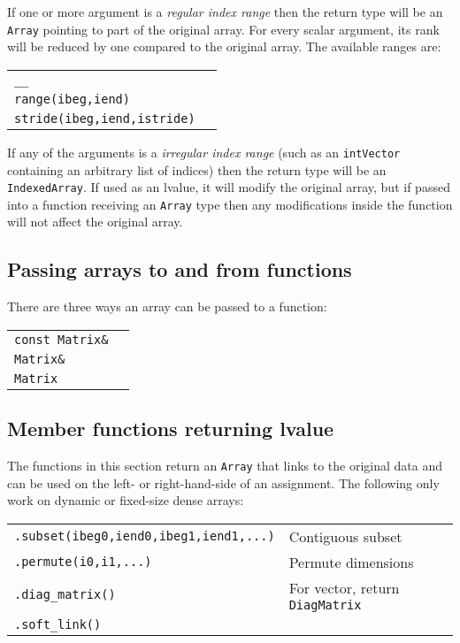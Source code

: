 \documentclass[10pt,a4,landscape]{article}
\def\code#1{\texttt{#1}}
\begin{document}
If one or more argument is a \textit{regular index range} then the return
type will be an \code{Array} pointing to part of the original
array. For every scalar argument, its rank will be reduced by one
compared to the original array. The available ranges are:\\
\begin{tabular}{ll}
\code{\_\_} & \\
\code{range(ibeg,iend)} &\\
\code{stride(ibeg,iend,istride)} &\\
\end{tabular}

If any of the arguments is a \textit{irregular index range} (such as
an \code{intVector} containing an arbitrary list of indices) then the
return type will be an \code{IndexedArray}. If used as an lvalue, it
will modify the original array, but if passed into a function
receiving an \code{Array} type then any modifications inside the
function will not affect the original array.
\subsection*{Passing arrays to and from functions}
There are three ways an array can be passed to a function:\\
\begin{tabular}{ll}
\code{const Matrix\&} \\
\code{Matrix\&} \\
\code{Matrix}
\end{tabular}

\subsection*{Member functions returning lvalue}
The functions in this section return an \code{Array} that links to the
original data and can be used on the left- or right-hand-side of an
assignment. The following only work on dynamic or fixed-size dense
arrays:\\
\begin{tabular}{ll}
\code{.subset(ibeg0,iend0,ibeg1,iend1,...)} & Contiguous subset\\
\code{.permute(i0,i1,...)} & Permute dimensions\\
\code{.diag\_matrix()} & For vector, return \code{DiagMatrix}\\
\code{.soft\_link()} \\
\end{tabular}
\end{document}
